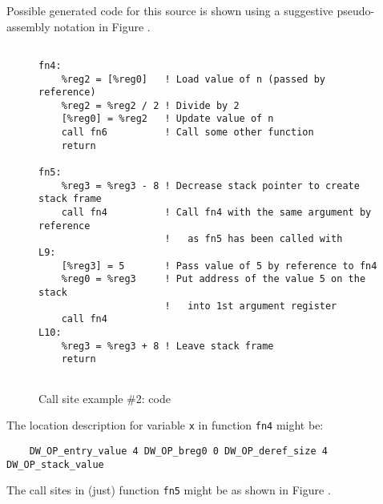 \clearpage
Possible generated code for this source is shown using a suggestive 
pseudo-\linebreak[0]assembly notation in Figure .
\begin{figure}[ht]
\begin{lstlisting}

fn4:
    %reg2 = [%reg0]   ! Load value of n (passed by reference)
    %reg2 = %reg2 / 2 ! Divide by 2
    [%reg0] = %reg2   ! Update value of n
    call fn6          ! Call some other function
    return

fn5:
    %reg3 = %reg3 - 8 ! Decrease stack pointer to create stack frame
    call fn4          ! Call fn4 with the same argument by reference 
                      !   as fn5 has been called with
L9:
    [%reg3] = 5       ! Pass value of 5 by reference to fn4
    %reg0 = %reg3     ! Put address of the value 5 on the stack
                      !   into 1st argument register
    call fn4
L10:
    %reg3 = %reg3 + 8 ! Leave stack frame
    return
    
\end{lstlisting}
\caption{Call site example \#2: code}
\label{fig:callsiteexample2code}
\end{figure}

The location description for variable \texttt{x} in function 
\texttt{fn4} might be:
\begin{lstlisting}
    DW_OP_entry_value 4 DW_OP_breg0 0 DW_OP_deref_size 4 DW_OP_stack_value
\end{lstlisting}

The call sites in (just) function \texttt{fn5} might be as shown in 
Figure .

